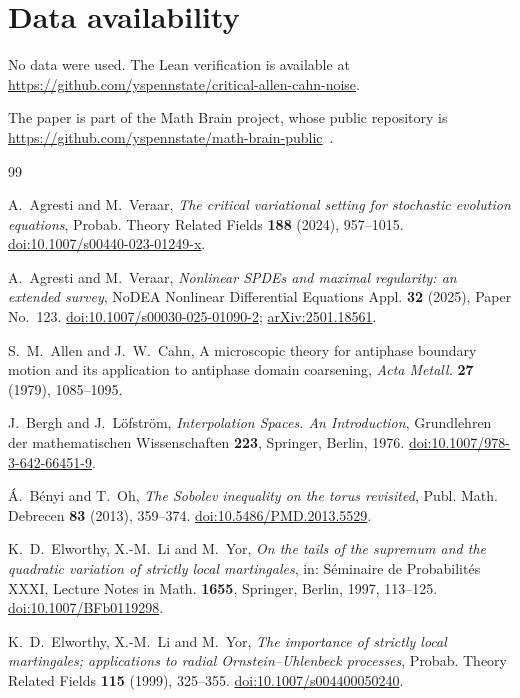 \documentclass[11pt]{amsart}
\theoremstyle{remark}
\begin{document}
\section*{Data availability}
No data were used. The Lean verification is available at \url{https://github.com/yspennstate/critical-allen-cahn-noise}.

The paper is part of the Math Brain project, whose public repository is \url{https://github.com/yspennstate/math-brain-public}~\cite{MathBrainRepo}.

\begin{thebibliography}{99}

A.~Agresti and M.~Veraar,
\emph{The critical variational setting for stochastic evolution equations},
Probab. Theory Related Fields \textbf{188} (2024), 957--1015.
\href{https://doi.org/10.1007/s00440-023-01249-x}{doi:10.1007/s00440-023-01249-x}.

A.~Agresti and M.~Veraar,
\emph{Nonlinear SPDEs and maximal regularity: an extended survey},
NoDEA Nonlinear Differential Equations Appl. \textbf{32} (2025), Paper No.~123.
\href{https://doi.org/10.1007/s00030-025-01090-2}{doi:10.1007/s00030-025-01090-2};
\href{https://arxiv.org/abs/2501.18561}{arXiv:2501.18561}.

S.~M.~Allen and J.~W.~Cahn,
A microscopic theory for antiphase boundary motion and its application to antiphase domain coarsening,
\emph{Acta Metall.} \textbf{27} (1979), 1085--1095.

J.~Bergh and J.~L\"ofstr\"om,
\emph{Interpolation Spaces. An Introduction},
Grundlehren der mathematischen Wissenschaften \textbf{223}, Springer, Berlin, 1976.
\href{https://doi.org/10.1007/978-3-642-66451-9}{doi:10.1007/978-3-642-66451-9}.

\'A.~B\'enyi and T.~Oh,
\emph{The Sobolev inequality on the torus revisited},
Publ. Math. Debrecen \textbf{83} (2013), 359--374.
\href{https://doi.org/10.5486/PMD.2013.5529}{doi:10.5486/PMD.2013.5529}.

K.~D.~Elworthy, X.-M.~Li and M.~Yor,
\emph{On the tails of the supremum and the quadratic variation of strictly local martingales},
in: S\'eminaire de Probabilit\'es XXXI, Lecture Notes in Math. \textbf{1655}, Springer, Berlin, 1997, 113--125.
\href{https://doi.org/10.1007/BFb0119298}{doi:10.1007/BFb0119298}.

K.~D.~Elworthy, X.-M.~Li and M.~Yor,
\emph{The importance of strictly local martingales; applications to radial Ornstein--Uhlenbeck processes},
Probab. Theory Related Fields \textbf{115} (1999), 325--355.
\href{https://doi.org/10.1007/s004400050240}{doi:10.1007/s004400050240}.


\end{thebibliography}
\end{document}
